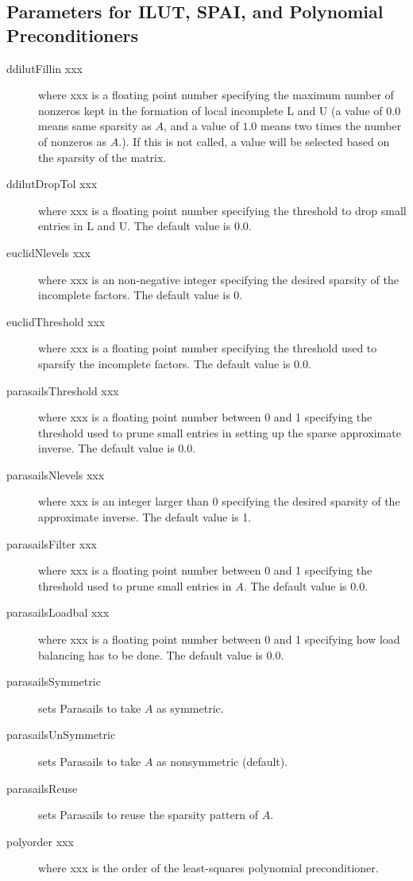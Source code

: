 \subsection{Parameters for ILUT, SPAI, and Polynomial Preconditioners}
                                                                                
\begin{description}
\item[ddilutFillin xxx] where xxx is a floating point number specifying
     the maximum number of nonzeros kept in the formation of local
     incomplete L and U (a value of $0.0$ means same sparsity as $A$,
     and a value of $1.0$ means two times the number of nonzeros as
     $A$.).  If this is not called, a value will be selected
     based on the sparsity of the matrix.
\item[ddilutDropTol xxx] where xxx is a floating point number specifying the
     threshold to drop small entries in L and U.  The default value is 0.0.
\item[euclidNlevels xxx] where xxx is an non-negative integer specifying
     the desired sparsity of the incomplete factors.  The default value is 0.
\item[euclidThreshold xxx] where xxx is a floating point number specifying
     the threshold used to sparsify the incomplete factors.  The default
     value is 0.0.
\item[parasailsThreshold xxx] where xxx is a floating point number between 0
     and 1 specifying the threshold used to prune small entries in setting
     up the sparse approximate inverse.  The default value is 0.0.
\item[parasailsNlevels xxx] where xxx is an integer larger than 0 specifying
     the desired sparsity of the approximate inverse.  The default value is 1.
\item[parasailsFilter xxx] where xxx is a floating point number between 0
     and 1 specifying the threshold used to prune small entries in $A$.  The
     default value is 0.0.
\item[parasailsLoadbal xxx] where xxx is a floating point number between 0
     and 1 specifying how load balancing has to be done.  The default value 
     is 0.0.
\item[parasailsSymmetric] sets Parasails to take $A$ as symmetric.
\item[parasailsUnSymmetric] sets Parasails to take $A$ as nonsymmetric
                            (default).
\item[parasailsReuse] sets Parasails to reuse the sparsity pattern of $A$.
\item[polyorder xxx] where xxx is the order of the least-squares polynomial
     preconditioner.
\end{description}
                                                                                
